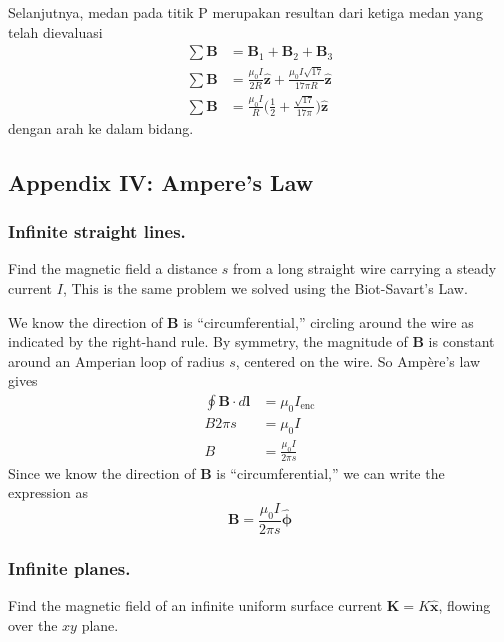 \documentclass[../../../main.tex]{subfiles}
\begin{document}
Selanjutnya, medan pada titik P merupakan resultan dari ketiga medan yang telah dievaluasi
\begin{align*}
    \sum \mathbf{B}& =\mathbf{B}_1+\mathbf{B}_2+\mathbf{B}_3\\
    \sum \mathbf{B}& =\frac{\mu_0 I}{2R}\mathbf{\hat{z}}+\frac{\mu_0 I\sqrt{17}}{17\pi R} \mathbf{\hat{z}}\\
    \sum \mathbf{B}& =\frac{\mu_0 I}{R}\biggl(\frac{1}{2}+\frac{\sqrt{17}}{17\pi}\biggr)\mathbf{\hat{z}}
\end{align*}
dengan arah ke dalam bidang.

\subsection{Appendix IV: Ampere's Law}
\subsubsection{Inﬁnite straight lines.} Find the magnetic ﬁeld a distance $s$ from a long straight wire carrying a steady current $I$, This is the same problem we solved using the Biot-Savart's Law. 

We know the direction of \textbf{B} is “circumferential,” circling around the wire as indicated by the right-hand rule. By symmetry, the magnitude of \textbf{B} is constant around an Amperian loop of radius $s$, centered on the wire. So Ampère’s law gives
\begin{align*}
    \oint \mathbf{B}\cdot d\mathbf{l}&=\mu_0I_{\text{enc}}\\
    B2\pi s&=\mu_0I\\
    B&=\frac{\mu_0I}{2\pi s}
\end{align*}
Since we know the direction of \textbf{B} is “circumferential,” we can write the expression as 
\begin{equation*}
    \mathbf{B}=\frac{\mu_0I}{2\pi s}\boldsymbol{\hat{\phi}}
\end{equation*}
\begin{figure}[ht]
    \centering
\end{figure}

\subsubsection{Inﬁnite planes.} Find the magnetic ﬁeld of an inﬁnite uniform surface current 
$\mathbf{K} = K \mathbf{\hat{x}}$, ﬂowing over the $xy$ plane. 
\end{document}
